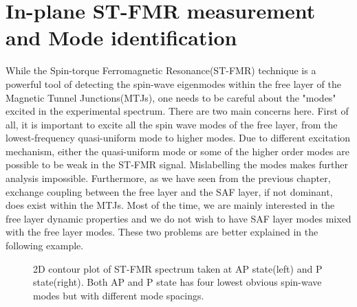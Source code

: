 \clearpage

\section{In-plane ST-FMR measurement and Mode identification}

While the Spin-torque Ferromagnetic Resonance(ST-FMR) technique is a powerful tool of detecting the spin-wave eigenmodes within the free layer of the Magnetic Tunnel Junctions(MTJs), one needs to be careful about the "modes" excited in the experimental spectrum. There are two main concerns here. First of all, it is important to excite all the spin wave modes of the free layer, from the lowest-frequency quasi-uniform mode to higher modes. Due to different excitation mechanism, either the quasi-uniform mode or some of the higher order modes are possible to be weak in the ST-FMR signal. Mislabelling the modes makes further analysis impossible. 
 Furthermore, as we have seen from the previous chapter, exchange coupling between the free layer and the SAF layer, if not dominant, does exist within the MTJs. Most of the time, we are mainly interested in the free layer dynamic properties and we do not wish to have SAF layer modes mixed with the free layer modes. These two problems are better explained in the following example.

\begin{figure}[!ht]
\centering
{}
\caption{2D contour plot of ST-FMR spectrum taken at AP state(left) and P state(right). Both AP and P state has four lowest obvious spin-wave modes but with different mode spacings.}
\end{figure}

